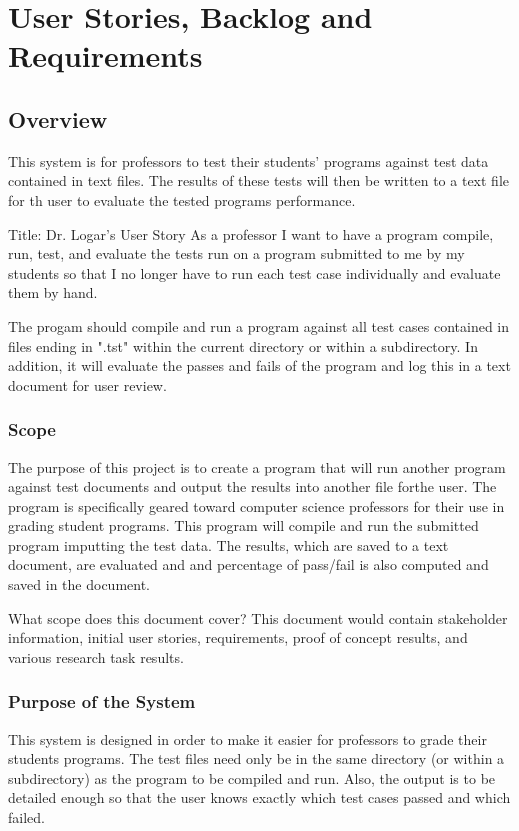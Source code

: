 \chapter{User Stories, Backlog and Requirements}
\section{Overview}


This system is for professors to test their students' programs against test data contained in text files. The results of these
tests will then be written to a text file for th user to evaluate the tested programs performance.

 Title: Dr. Logar's User Story
As a professor I want to have a program compile, run, test, and evaluate the tests run on a program submitted to me by 
my students so that I no longer have to run each test case individually and evaluate them by hand.


The progam should compile and run a program against all test cases contained in files ending in ".tst" within the current 
directory or within a subdirectory. In addition, it will evaluate the passes and fails of the program and log this in a text 
document for user review.


\subsection{Scope}
The purpose of this project is to create a program that will run another program against test documents and output the 
results into another file forthe user. The program is specifically geared toward computer science professors for their use in 
grading student programs. This program will compile and run the submitted program imputting the test data. The results, which are saved to a text document, are evaluated and and percentage of pass/fail is also computed and saved in the
document.

What scope does this document cover?  This document would contain stakeholder information, 
initial user stories, requirements, proof of concept results, and various research 
task results. 



\subsection{Purpose of the System}
This system is designed in order to make it easier for professors to grade their students programs. The test files need only be 
in the same directory (or within a subdirectory) as the program to be compiled and run. Also, the output is to be detailed 
enough so that the user knows exactly which test cases passed and which failed.


